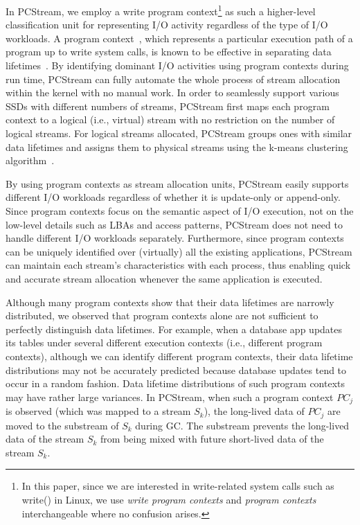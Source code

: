 In \textsf{\small PCStream}, we employ a write program context\footnote{In this paper, since we are 
interested in write-related system calls such as write() in Linux, 
we use {\it write program contexts} and {\it
program contexts} interchangeable where no confusion arises.} as such a higher-level 
classification unit for representing I/O activity regardless of the type of I/O workloads. 
A program context~\cite{PC, PC2}, which represents a particular execution path of a program 
up to write system calls,
is known to be effective in separating data lifetimes~\cite{PCHa}.  
By identifying dominant I/O activities using program contexts during run time, 
\textsf{\small PCStream} can fully automate the whole process of stream allocation within the 
kernel with no manual work.  In order to
seamlessly support various SSDs with different numbers of streams, \textsf{\small PCStream} first maps 
each program context to a logical (i.e., virtual) stream with no restriction 
on the number of logical streams.
For logical streams allocated, \textsf{\small PCStream} groups ones with similar data lifetimes 
and assigns them to physical streams using the k-means clustering algorithm~\cite{kmeans}. 

By using program contexts as stream allocation units, \textsf{\small PCStream} easily 
supports different I/O workloads regardless of whether it is update-only or append-only.   
Since program contexts focus on the
semantic aspect of I/O execution, not on the low-level details such as 
LBAs and access patterns, \textsf{\small PCStream} does not need to handle different I/O workloads 
separately.  Furthermore,
since program contexts can be uniquely identified over (virtually) all the 
existing applications, \textsf{\small PCStream} can maintain each stream's characteristics 
with each process, thus enabling quick and
accurate stream allocation whenever the same application is executed.

Although many program contexts show that their data lifetimes are 
narrowly distributed, we observed 
that program contexts alone are not sufficient to perfectly distinguish data lifetimes.  
For example, when a database app updates its 
tables under several different execution contexts (i.e., different program contexts),
although we can identify 
different program contexts, their data
lifetime distributions may not be accurately predicted because database 
updates tend to occur in a random fashion.  
Data lifetime distributions of such program contexts may have rather large variances.
In \textsf{\small PCStream}, 
when such a program context {\it $PC_j$} is observed 
(which was mapped to a stream {\it $S_k$}), 
the long-lived data of {\it $PC_j$} are moved to the substream of {\it $S_k$}
during GC.  
The substream prevents the long-lived data of the stream {\it $S_k$} 
from being mixed with future short-lived data of the stream {\it $S_k$}.

